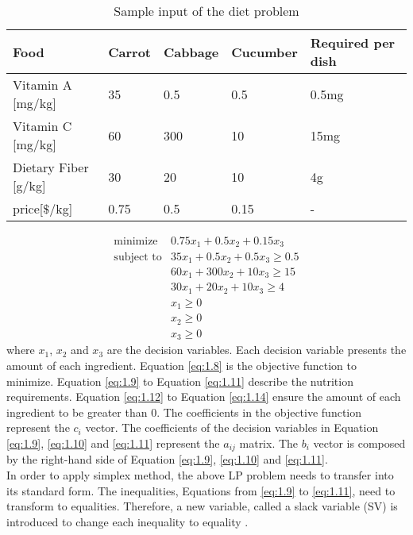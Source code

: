 \begin{table} 
\begin{center}
\begin{tabular}{| l | l  l  l | l |}
\hline
Food & Carrot & Cabbage & Cucumber & Required per dish \\ \hline
Vitamin A [mg/kg] & 35 & 0.5 & 0.5 & 0.5mg \\ 
Vitamin C [mg/kg] & 60 & 300 & 10 & 15mg \\ 
Dietary Fiber [g/kg] & 30 & 20 & 10 & 4g \\ \hline
price[$\$$/kg] & 0.75 & 0.5 & 0.15 & - \\ \hline
\end{tabular} 
\end{center}
\caption{Sample input of the diet problem}
\label{tab:1.1}
\end{table}	

\begin{eqnarray} 
\text{minimize} & 0.75x_{1} + 0.5x_{2} +  0.15x_{3}  \label{eq:1.8} \\
\text{subject to} & 35x_{1} + 0.5x_{2} + 0.5x_{3} \geq 0.5 \label{eq:1.9} \\
& 60x_{1} + 300x_{2} + 10x_{3} \geq 15 \label{eq:1.10} \\
& 30x_{1} + 20x_{2} + 10x_{3} \geq 4 \label{eq:1.11} \\
& x_{1} \geq 0  \label{eq:1.12} \\
& x_{2} \geq 0  \label{eq:1.13} \\
& x_{3} \geq 0  \label{eq:1.14}
\end{eqnarray} 
where $x_{1}$, $x_{2}$ and $x_{3}$ are the decision variables. Each decision variable presents the amount of each ingredient. Equation \ref{eq:1.8} is the objective function to minimize. Equation \ref{eq:1.9} to Equation \ref{eq:1.11} describe the nutrition requirements. Equation \ref{eq:1.12} to Equation \ref{eq:1.14} ensure the amount of each ingredient to be greater than 0. The coefficients in the objective function represent the $c_{i}$ vector. The coefficients of the decision variables in Equation \ref{eq:1.9}, \ref{eq:1.10} and \ref{eq:1.11} represent the $a_{ij}$ matrix. The $b_{i}$ vector is composed by the right-hand side of Equation \ref{eq:1.9}, \ref{eq:1.10} and \ref{eq:1.11}. \\

In order to apply simplex method, the above LP problem needs to transfer into its standard form. The inequalities, Equations from \ref{eq:1.9} to \ref{eq:1.11}, need to transform to equalities. Therefore, a new variable, called a slack variable (SV) is introduced to change each inequality to equality \cite{ConvexOptimization}. \\

